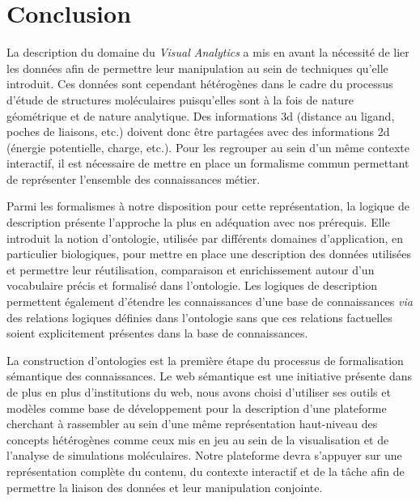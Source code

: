 \section{Conclusion}

La description du domaine du \textit{Visual Analytics} a mis en avant la nécessité de lier les données afin de permettre leur manipulation au sein de techniques qu'elle introduit. Ces données sont cependant hétérogènes dans le cadre du processus d'étude de structures moléculaires puisqu'elles sont à la fois de nature géométrique et de nature analytique. Des informations 3d (distance au ligand, poches de liaisons, etc.) doivent donc être partagées avec des informations 2d (énergie potentielle, charge, etc.). Pour les regrouper au sein d'un même contexte interactif, il est nécessaire de mettre en place un formalisme commun permettant de représenter l'ensemble des connaissances métier.

Parmi les formalismes à notre disposition pour cette représentation, la logique de description présente l'approche la plus en adéquation avec nos prérequis. Elle introduit la notion d'ontologie, utilisée par différents domaines d'application, en particulier biologiques, pour mettre en place une description des données utilisées et permettre leur réutilisation, comparaison et enrichissement autour d'un vocabulaire précis et formalisé dans l'ontologie. Les logiques de description permettent également d'étendre les connaissances d'une base de connaissances \textit{via} des relations logiques définies dans l'ontologie sans que ces relations factuelles soient explicitement présentes dans la base de connaissances.

La construction d'ontologies est la première étape du processus de formalisation sémantique des connaissances. Le web sémantique est une initiative présente dans de plus en plus d'institutions du web, nous avons choisi d'utiliser ses outils et modèles comme base de développement pour la description d'une plateforme cherchant à rassembler au sein d'une même représentation haut-niveau des concepts hétérogènes comme ceux mis en jeu au sein de la visualisation et de l'analyse de simulations moléculaires. Notre plateforme devra s'appuyer sur une représentation complète du contenu, du contexte interactif et de la tâche afin de permettre la liaison des données et leur manipulation  conjointe.

